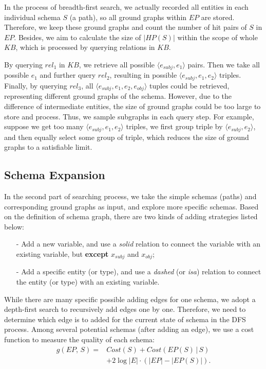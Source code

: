 In the process of breadth-first search, we actually recorded all entities in each individual schema $S$ (a path),
so all ground graphs within $EP$ are stored. 
Therefore, we keep these ground graphs and count the number of hit pairs of $S$ in $EP$.
Besides, we aim to calculate the size of $|HP(S)|$ within the scope of whole $KB$, 
which is processed by querying relations in $KB$.

By querying $rel_1$ in $KB$, we retrieve all possible $\langle e_{subj}, e_1 \rangle$ pairs.
Then we take all possible $e_1$ and further query $rel_2$, resulting in possible $\langle e_{subj}, e_1, e_2 \rangle$ triples.
Finally, by querying $rel_3$, all $\langle e_{subj}, e_1, e_2, e_{obj} \rangle$ tuples could be retrieved,
representing different ground graphs of the schema.
However, due to the difference of intermediate entities, the size of ground graphs could be too large to store and process.
Thus, we sample subgraphs in each query step. 
For example, suppose we get too many $\langle e_{subj}, e_1, e_2 \rangle$ triples,
we first group triple by $\langle e_{subj}, e_2 \rangle$, and then equally select some group of triple,
which reduces the size of ground graphs to a satisfiable limit.

\subsection{Schema Expansion}
In the second part of searching process, we take the simple schemas (paths) and 
corresponding ground graphs as input, and explore more specific schemas.
Based on the definition of schema graph, there are two kinds of adding strategies listed below:
\begin{itemize}
    \item[-] Add a new variable, and use a \textit{solid} relation to connect the variable with an existing variable, 
    but \textbf{except} $x_{subj}$ and $x_{obj}$;
    \item[-] Add a specific entity (or type), and use a \textit{dashed} (or \textit{isa}) relation to
    connect the entity (or type) with an existing variable.
\end{itemize}
While there are many specific possible adding edges for one schema, we adopt
a depth-first search to recursively add edges one by one.
Therefore, we need to determine which edge is to added for the current state of schema in the DFS process.
Among several potential schemas (after adding an edge), we use a cost function to measure the quality
of each schema:
\begin{equation}
\label{eqn:dfs}
\begin{aligned}
g(EP,\, S) = & Cost(S) + Cost(EP(S)\, |\, S) \\
             & + 2 \log |E| \cdot (|EP| - |EP(S)|).
\end{aligned}
\end{equation}

